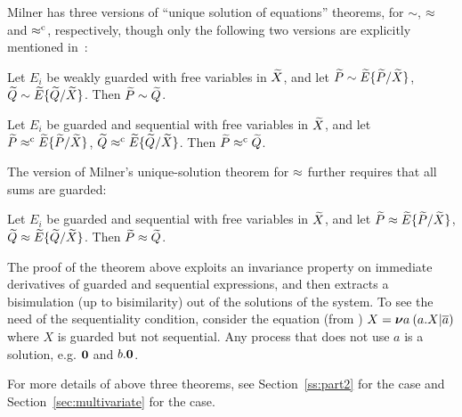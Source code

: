 Milner has  three versions of  ``unique solution of equations''
theorems, for $\sim$, $\approx$ and $\mathrel{\approx^{\rm{c}}}$, respectively, though only the
following two versions are explicitly mentioned in~\citep[p.~103, 158]{Mil89}:
\begin{theorem}
\label{t:Mil89s1}
Let $E_i$ be weakly guarded with free variables in $\widetilde X$,
and let ${\widetilde P} \sim {\widetilde E}\{\widetilde P /\widetilde X\}$,
  ${\widetilde Q} \sim {\widetilde E}\{\widetilde Q /\widetilde X\}$. Then ${\widetilde P} \sim {\widetilde Q}$.
\end{theorem}

\begin{theorem}
\label{t:Mil89s3}
Let $E_i$ be guarded and sequential with free
variables in $\widetilde X$, and let ${\widetilde P} \mathrel{\approx^{\rm{c}}} {\widetilde E}\{\widetilde P /\widetilde X\}$,
  ${\widetilde Q} \mathrel{\approx^{\rm{c}}} {\widetilde E}\{\widetilde Q /\widetilde X\}$. Then ${\widetilde P} \mathrel{\approx^{\rm{c}}} {\widetilde Q}$.
\end{theorem}

The version of Milner's unique-solution theorem for $\approx$ further requires
that all sums are guarded:
\begin{theorem}
\label{t:Mil89}
Let $E_i$ be guarded and sequential with free
variables in $\widetilde X$, and let ${\widetilde P} \approx {\widetilde E}\{\widetilde P /\widetilde X\}$,
  ${\widetilde Q} \approx {\widetilde E}\{\widetilde Q /\widetilde X\}$. Then ${\widetilde P} \approx {\widetilde Q}$.
\end{theorem}

The proof of the theorem above exploits an invariance
property on immediate derivatives
of guarded and sequential expressions, and then extracts a bisimulation
(up to bisimilarity) out
of the solutions of the system.
To see the need of the sequentiality  condition, consider
 the equation (from \cite{Mil89}) $X = {\boldsymbol \nu} a\: (a. X | \overline{a})$
where $X$ is guarded but not sequential. Any process that does not use
$a$ is a solution, e.g. ${\boldsymbol 0}$ and $b.{\boldsymbol 0}$.

For more details of above three theorems, see Section~\ref{ss:part2}
for the \univariate case and
Section~\ref{sec:multivariate} for the \multivariate case.

